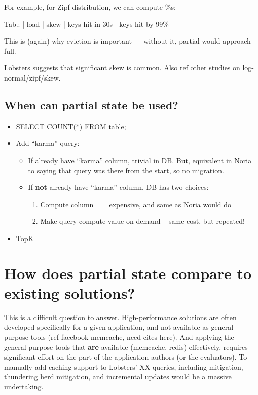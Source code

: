 For example, for Zipf distribution, we can compute \%s:

Tab.: | load | skew | keys hit in 30s | keys hit by 99\% | 

This is (again) why eviction is important — without it, partial would approach
full.

Lobsters suggests that significant skew is common. Also ref other
studies on log-normal/zipf/skew.

\subsection{When can partial state be used?}

\begin{itemize}
 \item SELECT COUNT(*) FROM table;
 \item Add ``karma'' query:
   \begin{itemize}
    \item If already have ``karma'' column, trivial in DB. But, equivalent in
      Noria to saying that query was there from the start, so no migration.
    \item If \textbf{not} already have ``karma'' column, DB has two choices:
     \begin{enumerate}
      \item Compute column == expensive, and same as Noria would do
      \item Make query compute value on-demand -- same cost, but repeated!
     \end{enumerate}
   \end{itemize}
 \item TopK
\end{itemize}

\section{How does partial state compare to existing solutions?}
\label{s:eval:existing}

This is a difficult question to answer. High-performance solutions are
often developed specifically for a given application, and not available
as general-purpose tools (ref facebook memcache, need cites here).
And applying the general-purpose tools that \textbf{are} available (memcache,
redis) effectively, requires significant effort on the part of the
application authors (or the evaluators). To manually add caching support
to Lobsters' XX queries, including mitigation, thundering herd
mitigation, and incremental updates would be a massive undertaking.

